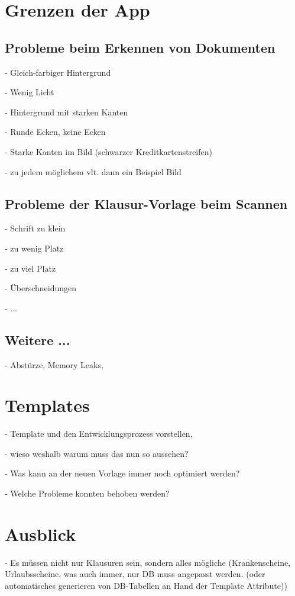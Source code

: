 \documentclass[nomenclature, onesided, 150]{HSMW-Thesis}
\begin{document}
\chapter{Grenzen der App}
	\section{Probleme beim Erkennen von Dokumenten}
		- Gleich-farbiger Hintergrund
			
		- Wenig Licht
		
		- Hintergrund mit starken Kanten
		
		- Runde Ecken, keine Ecken
		
		- Starke Kanten im Bild (schwarzer Kreditkartenstreifen)
		
		- zu jedem möglichem vlt. dann ein Beispiel Bild
		
	\section{Probleme der Klausur-Vorlage beim Scannen}
		- Schrift zu klein
		
		- zu wenig Platz
		
		- zu viel Platz
		
		- Überschneidungen
		
		- ...
		
	\section{Weitere ...}
		- Abstürze, Memory Leaks, 




\chapter{Templates}
	- Template und den Entwicklungsprozess vorstellen, 
	
	- wieso weshalb warum muss das nun so aussehen?
	
	- Was kann an der neuen Vorlage immer noch optimiert werden?	
	
	- Welche Probleme konnten behoben werden?
	
		
\chapter{Ausblick}
	- Es müssen nicht nur Klausuren sein, sondern alles mögliche (Krankenscheine, Urlaubsscheine, was auch immer, nur DB muss angepasst werden. (oder automatisches generieren von DB-Tabellen an Hand der Template Attribute))
	
\end{document}
